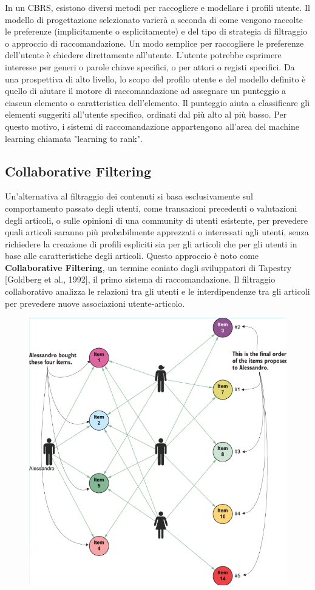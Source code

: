 In un CBRS, esistono diversi metodi per raccogliere e modellare i profili utente. Il modello di progettazione selezionato varierà a seconda di come vengono raccolte le preferenze (implicitamente o esplicitamente) e del tipo di strategia di filtraggio o approccio di raccomandazione. Un modo semplice per raccogliere le preferenze dell'utente è chiedere direttamente all'utente. L'utente potrebbe esprimere interesse per generi o parole chiave specifici, o per attori o registi specifici. Da una prospettiva di alto livello, lo scopo del profilo utente e del modello definito è quello di aiutare il motore di raccomandazione ad assegnare un punteggio a ciascun elemento o caratteristica dell'elemento. Il punteggio aiuta a classificare gli elementi suggeriti all'utente specifico, ordinati dal più alto al più basso. Per questo motivo, i sistemi di raccomandazione appartengono all'area del machine learning chiamata "learning to rank".
\newpage


\subsection{Collaborative Filtering}
Un'alternativa al filtraggio dei contenuti si basa esclusivamente sul comportamento passato degli utenti, come transazioni precedenti o valutazioni degli articoli, o sulle opinioni di una community di utenti esistente, per prevedere quali articoli saranno più probabilmente apprezzati o interessati agli utenti, senza richiedere la creazione di profili espliciti sia per gli articoli che per gli utenti in base alle caratteristiche degli articoli. Questo approccio è noto come \textbf{Collaborative Filtering}, un termine coniato dagli sviluppatori di Tapestry [Goldberg et al., 1992], il primo sistema di raccomandazione. Il filtraggio collaborativo analizza le relazioni tra gli utenti e le interdipendenze tra gli articoli per prevedere nuove associazioni utente-articolo.

\begin{figure}[th]
    \centering
    \includegraphics[width=0.45\linewidth]{RecommendationsGraph//img/collaborativefiltering.png}
\end{figure}

